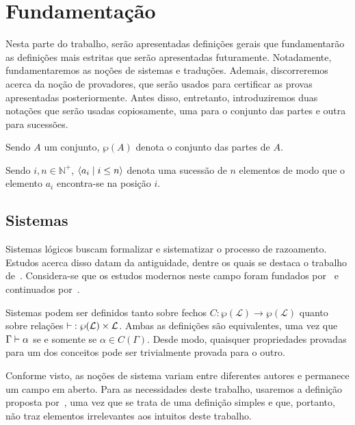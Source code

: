 \chapter{Fundamentação}

Nesta parte do trabalho, serão apresentadas definições gerais que fundamentarão as definições mais estritas que serão apresentadas futuramente. Notadamente, fundamentaremos as noções de sistemas e traduções. Ademais, discorreremos acerca da noção de provadores, que serão usados para certificar as provas apresentadas posteriormente. Antes disso, entretanto, introduziremos duas notações que serão usadas copiosamente, uma para o conjunto das partes e outra para sucessões.

\begin{notation}
    Sendo $A$ um conjunto, $\wp(A)$ denota o conjunto das partes de $A$.
\end{notation}

\begin{notation}
    Sendo $i,n\in\mathbb{N}^+$, $\langle a_i\mid i\leq n\rangle$ denota uma sucessão de $n$ elementos de modo que o elemento $a_i$ encontra-se na posição $i$.
\end{notation}

\section{Sistemas}

Sistemas lógicos buscam formalizar e sistematizar o processo de razoamento. Estudos acerca disso datam da antiguidade, dentre os quais se destaca o trabalho de~\cite{Aristotle}. Considera-se que os estudos modernos neste campo foram fundados por~\cite{Frege} e continuados por~\cite{Russel-A,Russel-B,Russel-C}.

Sistemas podem ser definidos tanto sobre fechos $C:\wp(\mathcal{L})\to\wp(\mathcal{L})$ quanto sobre relações $\mathrel{\vdash}\: :\wp(\mathcal{L})\times\mathcal{L}$. Ambas as definições são equivalentes, uma vez que $\Gamma\mathrel{\vdash}\alpha$ se e somente se $\alpha\in C(\Gamma)$. Desde modo, quaisquer propriedades provadas para um dos conceitos pode ser trivialmente provada para o outro.

Conforme visto, as noções de sistema variam entre diferentes autores e permanece um campo em aberto. Para as necessidades deste trabalho, usaremos a definição proposta por~\cite{Beziau}, uma vez que se trata de uma definição simples e que, portanto, não traz elementos irrelevantes aos intuitos deste trabalho.

